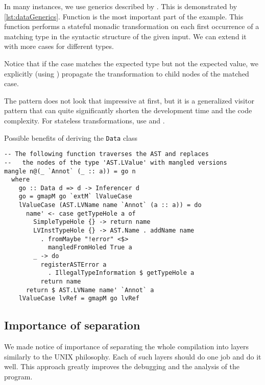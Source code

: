 In many instances, we use generics described by \citet{lammel2003scrap}. This is demonstrated by \cref{lst:dataGenerics}. Function  is the most important part of the example. This function performs a stateful monadic transformation  on each first occurrence of a matching type in the syntactic structure of the given input. We can extend it with more  cases for different types.

Notice that if the case matches the expected type but not the expected value, we explicitly (using ) propagate the transformation to child nodes of the matched case.

The  pattern does not look that impressive at first, but it is a generalized visitor pattern that can quite significantly shorten the development time and the code complexity. For stateless transformations, use  and .

\begin{listing}
    \caption{Possible benefits of deriving the \texttt{Data} class}
    \label{lst:dataGenerics}
    \begin{lstlisting}[style=haskellStyle]
-- The following function traverses the AST and replaces
--   the nodes of the type 'AST.LValue' with mangled versions
mangle n@(_ `Annot` (_ :: a)) = go n
  where
    go :: Data d => d -> Inferencer d
    go = gmapM go `extM` lValueCase
    lValueCase (AST.LVName name `Annot` (a :: a)) = do
      name' <- case getTypeHole a of
        SimpleTypeHole {} -> return name
        LVInstTypeHole {} -> AST.Name . addName name
          . fromMaybe "!error" <$>
            mangledFromHoled True a
        _ -> do
          registerASTError a
            . IllegalTypeInformation $ getTypeHole a
          return name
      return $ AST.LVName name' `Annot` a
    lValueCase lvRef = gmapM go lvRef
    \end{lstlisting}

\end{listing}

\subsection{Importance of separation}

We made notice of importance of separating the whole compilation into layers similarly to the UNIX philosophy. Each of such layers should do one job and do it well. This approach greatly improves the debugging and the analysis of the program.

